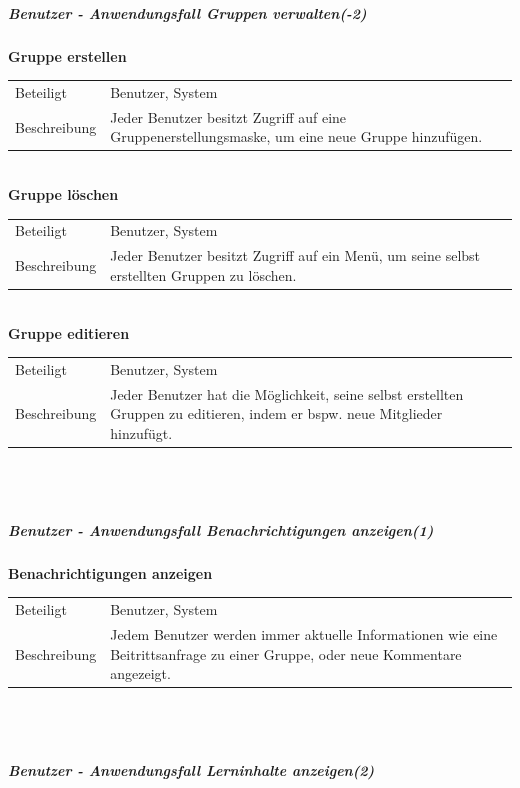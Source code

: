 \documentclass[12pt,a4paper]{article}
\begin{document}
\subparagraph{Benutzer - Anwendungsfall \glqq Gruppen verwalten\grqq (-2)}\mbox{}

\textbf{Gruppe erstellen}\\
\begin{tabular}{l|p{12cm}}
\hline 
Beteiligt & Benutzer, System \\ 
Beschreibung & Jeder Benutzer besitzt Zugriff auf eine Gruppenerstellungsmaske, um eine neue Gruppe hinzufügen. \\ 
\end{tabular}\\

\textbf{Gruppe löschen}\\
\begin{tabular}{l|p{12cm}}
\hline 
Beteiligt & Benutzer, System \\ 
Beschreibung & Jeder Benutzer besitzt Zugriff auf ein Menü, um seine selbst erstellten Gruppen zu löschen. \\ 
\end{tabular}\\

\textbf{Gruppe editieren}\\
\begin{tabular}{l|p{12cm}}
\hline 
Beteiligt & Benutzer, System \\ 
Beschreibung & Jeder Benutzer hat die Möglichkeit, seine selbst erstellten Gruppen zu editieren, indem er bspw. neue Mitglieder hinzufügt. \\ 
\end{tabular}\\\\


\subparagraph{Benutzer - Anwendungsfall \glqq Benachrichtigungen anzeigen\grqq  (1)}\mbox{}

\textbf{Benachrichtigungen anzeigen}\\
\begin{tabular}{l|p{12cm}}
\hline 
Beteiligt & Benutzer, System \\ 
Beschreibung & Jedem Benutzer werden immer aktuelle Informationen wie eine Beitrittsanfrage zu einer Gruppe, oder neue Kommentare angezeigt. \\ 
\end{tabular}\\\\
 


\subparagraph{Benutzer - Anwendungsfall \glqq Lerninhalte anzeigen\grqq  (2)}\mbox{}
\end{document}
